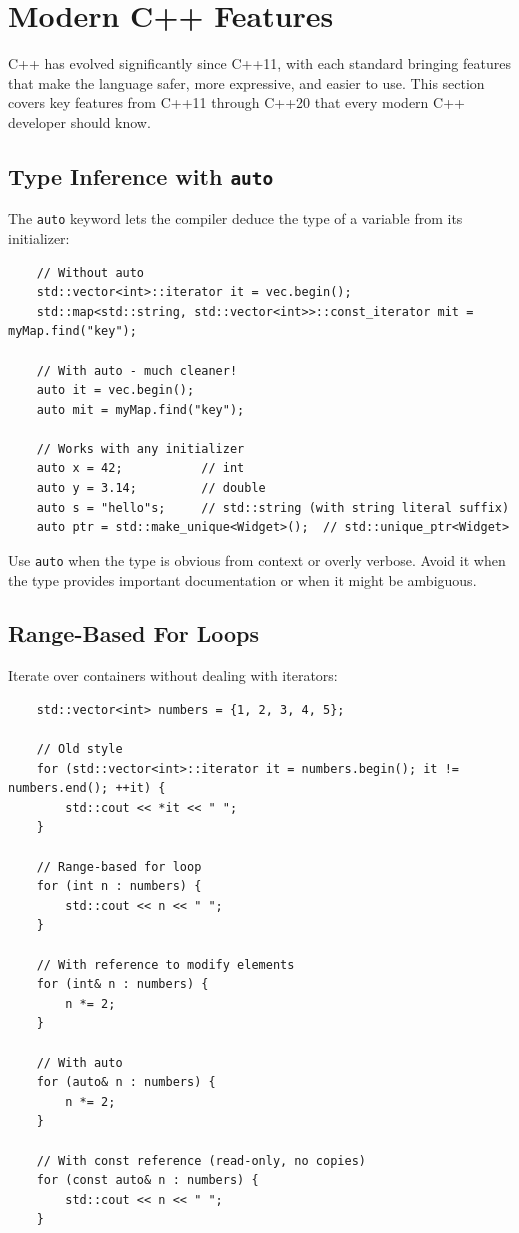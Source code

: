 \section{Modern C++ Features}

C++ has evolved significantly since C++11, with each standard bringing features that make the language safer, more expressive, and easier to use. This section covers key features from C++11 through C++20 that every modern C++ developer should know.

\subsection{Type Inference with \texttt{auto}}

The \texttt{auto} keyword lets the compiler deduce the type of a variable from its initializer:

\begin{lstlisting}
	// Without auto
	std::vector<int>::iterator it = vec.begin();
	std::map<std::string, std::vector<int>>::const_iterator mit = myMap.find("key");
	
	// With auto - much cleaner!
	auto it = vec.begin();
	auto mit = myMap.find("key");
	
	// Works with any initializer
	auto x = 42;           // int
	auto y = 3.14;         // double
	auto s = "hello"s;     // std::string (with string literal suffix)
	auto ptr = std::make_unique<Widget>();  // std::unique_ptr<Widget>
\end{lstlisting}

\begin{remark}
	Use \texttt{auto} when the type is obvious from context or overly verbose. Avoid it when the type provides important documentation or when it might be ambiguous.
\end{remark}

\subsection{Range-Based For Loops}

Iterate over containers without dealing with iterators:

\begin{lstlisting}
	std::vector<int> numbers = {1, 2, 3, 4, 5};
	
	// Old style
	for (std::vector<int>::iterator it = numbers.begin(); it != numbers.end(); ++it) {
		std::cout << *it << " ";
	}
	
	// Range-based for loop
	for (int n : numbers) {
		std::cout << n << " ";
	}
	
	// With reference to modify elements
	for (int& n : numbers) {
		n *= 2;
	}
	
	// With auto
	for (auto& n : numbers) {
		n *= 2;
	}
	
	// With const reference (read-only, no copies)
	for (const auto& n : numbers) {
		std::cout << n << " ";
	}
\end{lstlisting}

